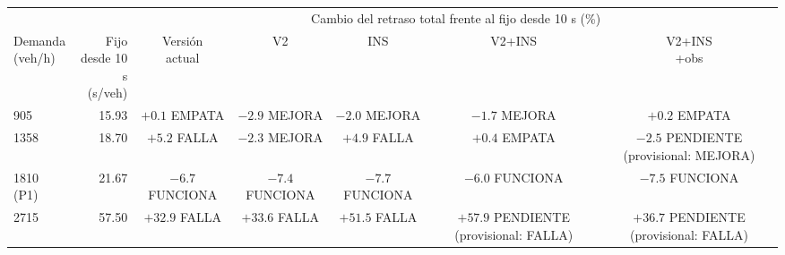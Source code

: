 \begin{tabular}{lrccccc}
\toprule
 & & \multicolumn{5}{c}{Cambio del retraso total frente al fijo desde 10 s (\%)} \\
\cmidrule(lr){3-7}
\makecell[tl]{Demanda\\(veh/h)} & \makecell[tr]{Fijo\\desde 10 s\\(s/veh)} & \makecell{Versión\\actual} & V2 & INS & V2+INS & \makecell{V2+INS\\+obs} \\
\midrule
905 & 15.93 & \makecell[t]{$+0.1$\\{}EMPATA} & \makecell[t]{$-2.9$\\{}MEJORA} & \makecell[t]{$-2.0$\\{}MEJORA} & \makecell[t]{$-1.7$\\{}MEJORA} & \makecell[t]{$+0.2$\\{}EMPATA} \\[3pt]
1358 & 18.70 & \makecell[t]{$+5.2$\\{}FALLA} & \makecell[t]{$-2.3$\\{}MEJORA} & \makecell[t]{$+4.9$\\{}FALLA} & \makecell[t]{$+0.4$\\{}EMPATA} & \makecell[t]{$-2.5$\\{}PENDIENTE\\{}(provisional:\\{}MEJORA)} \\[3pt]
1810 (P1) & 21.67 & \makecell[t]{$-6.7$\\{}FUNCIONA} & \makecell[t]{$-7.4$\\{}FUNCIONA} & \makecell[t]{$-7.7$\\{}FUNCIONA} & \makecell[t]{$-6.0$\\{}FUNCIONA} & \makecell[t]{$-7.5$\\{}FUNCIONA} \\[3pt]
2715 & 57.50 & \makecell[t]{$+32.9$\\{}FALLA} & \makecell[t]{$+33.6$\\{}FALLA} & \makecell[t]{$+51.5$\\{}FALLA} & \makecell[t]{$+57.9$\\{}PENDIENTE\\{}(provisional:\\{}FALLA)} & \makecell[t]{$+36.7$\\{}PENDIENTE\\{}(provisional:\\{}FALLA)} \\[3pt]

\end{tabular}
